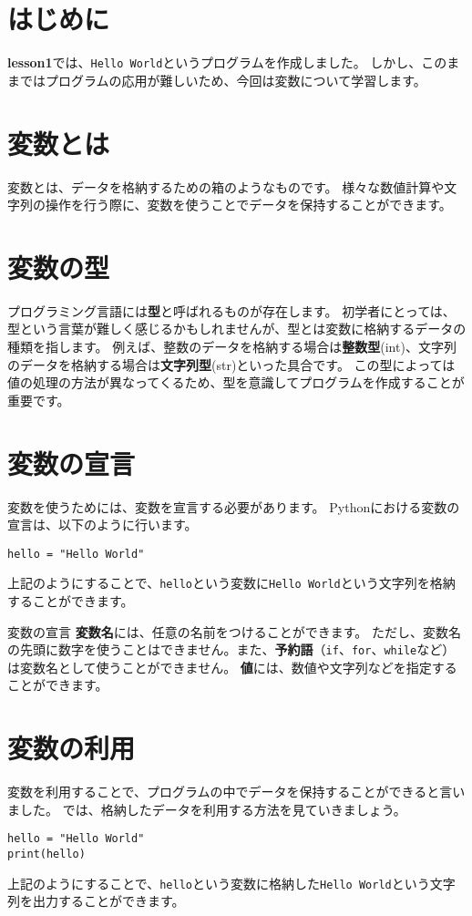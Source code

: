 \documentclass[a4paper,titlepage,dvipdfmx]{jarticle}
\begin{document}
\section{はじめに}
\textbf{lesson1}では、\texttt{Hello World}というプログラムを作成しました。
しかし、このままではプログラムの応用が難しいため、今回は変数について学習します。
\section{変数とは}
変数とは、データを格納するための箱のようなものです。
様々な数値計算や文字列の操作を行う際に、変数を使うことでデータを保持することができます。

\section{変数の型}
プログラミング言語には\textbf{型}と呼ばれるものが存在します。
初学者にとっては、型という言葉が難しく感じるかもしれませんが、型とは変数に格納するデータの種類を指します。
例えば、整数のデータを格納する場合は\textbf{整数型}(int)、文字列のデータを格納する場合は\textbf{文字列型}(str)といった具合です。
この型によっては値の処理の方法が異なってくるため、型を意識してプログラムを作成することが重要です。

\section{変数の宣言}
変数を使うためには、変数を宣言する必要があります。
Pythonにおける変数の宣言は、以下のように行います。
\begin{lstlisting}[caption=変数の宣言,label=変数の宣言]
hello = "Hello World"
\end{lstlisting}
上記のようにすることで、\texttt{hello}という変数に\texttt{Hello World}という文字列を格納することができます。
\begin{itembox}[l]{変数の宣言}
  \textbf{変数名}には、任意の名前をつけることができます。
  ただし、変数名の先頭に数字を使うことはできません。また、\textbf{予約語}（\texttt{if}、\texttt{for}、\texttt{while}など）は変数名として使うことができません。
  \textbf{値}には、数値や文字列などを指定することができます。
\end{itembox}

\section{変数の利用}
変数を利用することで、プログラムの中でデータを保持することができると言いました。
では、格納したデータを利用する方法を見ていきましょう。
\begin{lstlisting}[caption=変数の利用,label=変数の利用]
hello = "Hello World"
print(hello)
\end{lstlisting}
上記のようにすることで、\texttt{hello}という変数に格納した\texttt{Hello World}という文字列を出力することができます。
\end{document}
